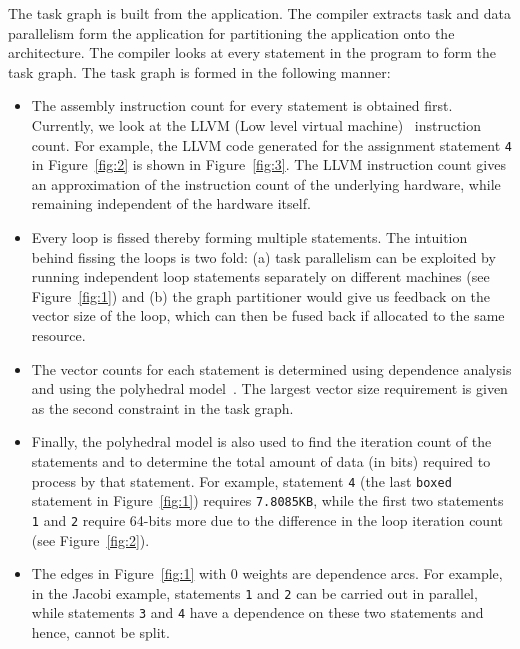 The task graph is built from the application. The compiler extracts task
and data parallelism form the application for partitioning the
application onto the architecture. The compiler looks at every statement
in the program to form the task graph. The task graph is formed in the
following manner:

\begin{itemize}

\item The assembly instruction count for every statement is obtained
  first. Currently, we look at the LLVM (Low level virtual
  machine)~\cite{clat04} instruction count. For example, the LLVM code
  generated for the assignment statement \texttt{4} in
  Figure~\ref{fig:2} is shown in Figure~\ref{fig:3}. The LLVM
  instruction count gives an approximation of the instruction count of
  the underlying hardware, while remaining independent of the hardware
  itself.

\item Every loop is fissed thereby forming multiple statements. The
  intuition behind fissing the loops is two fold: (a) task parallelism
  can be exploited by running independent loop statements separately on
  different machines (see Figure~\ref{fig:1}) and (b) the graph
  partitioner would give us feedback on the vector size of the loop,
  which can then be fused back if allocated to the same resource.

\item The vector counts for each statement is determined using
  dependence analysis and using the polyhedral model~\cite{mgri98}. The
  largest vector size requirement is given as the second constraint in
  the task graph.

\item Finally, the polyhedral model is also used to find the iteration
  count of the statements and to determine the total amount of data (in
  bits) required to process by that statement. For example, statement
  \texttt{4} (the last \texttt{boxed} statement in Figure~\ref{fig:1})
  requires \texttt{7.8085KB}, while the first two statements \texttt{1}
  and \texttt{2} require 64-bits more due to the difference in the loop
  iteration count (see Figure~\ref{fig:2}).

\item The edges in Figure~\ref{fig:1} with 0 weights are dependence
  arcs. For example, in the Jacobi example, statements \texttt{1} and
  \texttt{2} can be carried out in parallel, while statements
  \texttt{3} and \texttt{4} have a dependence on these two statements
  and hence, cannot be split.

\end{itemize}

